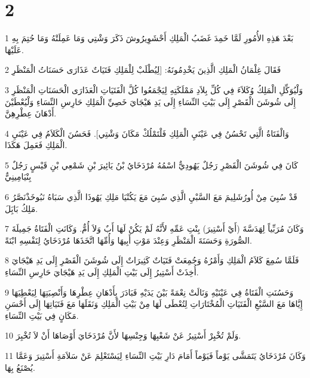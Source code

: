 \chapter{2}

\par 1 بَعْدَ هَذِهِ الأُمُورِ لَمَّا خَمِدَ غَضَبُ الْمَلِكِ أَحْشَوِيرُوشَ ذَكَرَ وَشْتِي وَمَا عَمِلَتْهُ وَمَا حُتِمَ بِهِ عَلَيْهَا.
\par 2 فَقَالَ غِلْمَانُ الْمَلِكِ الَّذِينَ يَخْدِمُونَهُ: [لِيُطْلَبْ لِلْمَلِكِ فَتَيَاتٌ عَذَارَى حَسَنَاتُ الْمَنْظَرِ
\par 3 وَلْيُوَكِّلِ الْمَلِكُ وُكَلاَءَ فِي كُلِّ بِلاَدِ مَمْلَكَتِهِ لِيَجْمَعُوا كُلَّ الْفَتَيَاتِ الْعَذَارَى الْحَسَنَاتِ الْمَنْظَرِ إِلَى شُوشَنَ الْقَصْرِ إِلَى بَيْتِ النِّسَاءِ إِلَى يَدِ هَيْجَايَ خَصِيِّ الْمَلِكِ حَارِسِ النِّسَاءِ وَلْيُعْطَيْنَ أَدْهَانَ عِطْرِهِنَّ.
\par 4 وَالْفَتَاةُ الَّتِي تَحْسُنُ فِي عَيْنَيِ الْمَلِكِ فَلْتَمْلُكْ مَكَانَ وَشْتِي]. فَحَسُنَ الْكَلاَمُ فِي عَيْنَيِ الْمَلِكِ فَعَمِلَ هَكَذَا.
\par 5 كَانَ فِي شُوشَنَ الْقَصْرِ رَجُلٌ يَهُودِيٌّ اسْمُهُ مُرْدَخَايُ بْنُ يَائِيرَ بْنِ شَمْعِي بْنِ قَيْسٍ رَجُلٌ بِنْيَامِينِيٌّ
\par 6 قَدْ سُبِيَ مِنْ أُورُشَلِيمَ مَعَ السَّبْيِ الَّذِي سُبِيَ مَعَ يَكُنْيَا مَلِكِ يَهُوذَا الَّذِي سَبَاهُ نَبُوخَذْنَصَّرُ مَلِكُ بَابَِلَ.
\par 7 وَكَانَ مُرَبِّياً لِهَدَسَّةَ (أَيْ أَسْتِيرَ) بِنْتِ عَمِّهِ لأَنَّهُ لَمْ يَكُنْ لَهَا أَبٌ وَلاَ أُمٌّ. وَكَانَتِ الْفَتَاةُ جَمِيلَةَ الصُّورَةِ وَحَسَنَةَ الْمَنْظَرِ وَعِنْدَ مَوْتِ أَبِيهَا وَأُمِّهَا اتَّخَذَهَا مُرْدَخَايُ لِنَفْسِهِ ابْنَةً.
\par 8 فَلَمَّا سُمِعَ كَلاَمُ الْمَلِكِ وَأَمْرُهُ وَجُمِعَتْ فَتَيَاتٌ كَثِيرَاتٌ إِلَى شُوشَنَ الْقَصْرِ إِلَى يَدِ هَيْجَايَ أُخِذَتْ أَسْتِيرُ إِلَى بَيْتِ الْمَلِكِ إِلَى يَدِ هَيْجَايَ حَارِسِ النِّسَاءِ.
\par 9 وَحَسُنَتِ الْفَتَاةُ فِي عَيْنَيْهِ وَنَالَتْ نِعْمَةً بَيْنَ يَدَيْهِ فَبَادَرَ بِأَدْهَانِ عِطْرِهَا وَأَنْصِبَتِهَا لِيَعْطِيَهَا إِيَّاهَا مَعَ السَّبْعِ الْفَتَيَاتِ الْمُخْتَارَاتِ لِتُعْطَى لَهَا مِنْ بَيْتِ الْمَلِكِ وَنَقَلَهَا مَعَ فَتَيَاتِهَا إِلَى أَحْسَنِ مَكَانٍ فِي بَيْتِ النِّسَاءِ.
\par 10 وَلَمْ تُخْبِرْ أَسْتِيرُ عَنْ شَعْبِهَا وَجِنْسِهَا لأَنَّ مُرْدَخَايَ أَوْصَاهَا أَنْ لاَ تُخْبِرَ.
\par 11 وَكَانَ مُرْدَخَايُ يَتَمَشَّى يَوْماً فَيَوْماً أَمَامَ دَارِ بَيْتِ النِّسَاءِ لِيَسْتَعْلِمَ عَنْ سَلاَمَةِ أَسْتِيرَ وَعَمَّا يُصْنَعُ بِهَا.
